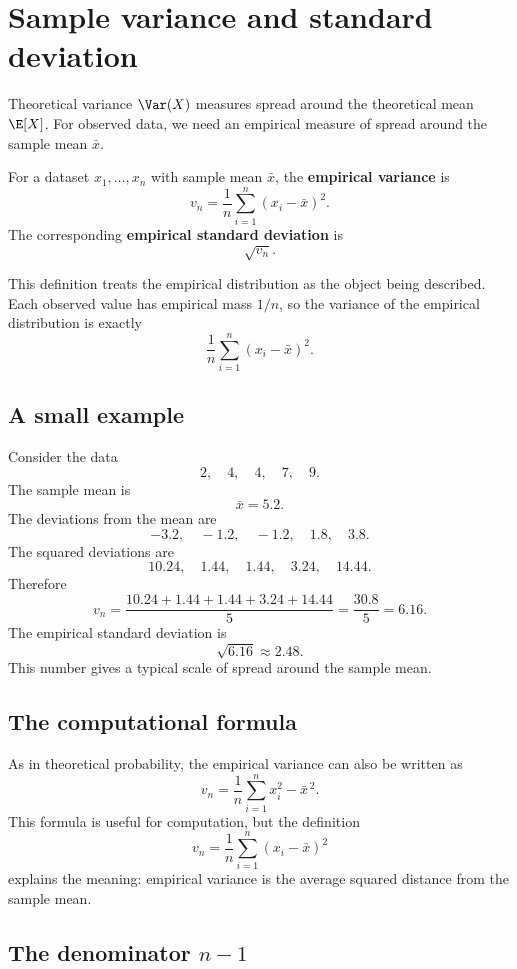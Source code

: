 \section{Sample variance and standard deviation}

Theoretical variance \(\Var(X)\) measures spread around the theoretical mean
\(\E[X]\). For observed data, we need an empirical measure of spread around the
sample mean \(\bar{x}\).

\begin{definitionbox}
For a dataset \(x_1,
\ldots,x_n\) with sample mean \(\bar{x}\), the
\textbf{empirical variance} is
\[
v_n=\frac1n\sum_{i=1}^n (x_i-\bar{x})^2.
\]
The corresponding \textbf{empirical standard deviation} is
\[
\sqrt{v_n}.
\]
\end{definitionbox}

This definition treats the empirical distribution as the object being described.
Each observed value has empirical mass \(1/n\), so the variance of the empirical
distribution is exactly
\[
\frac1n\sum_{i=1}^n (x_i-\bar{x})^2.
\]

\subsection*{A small example}

Consider the data
\[
2,\quad 4,\quad 4,\quad 7,\quad 9.
\]
The sample mean is
\[
\bar{x}=5.2.
\]
The deviations from the mean are
\[
-3.2,\quad -1.2,\quad -1.2,\quad 1.8,\quad 3.8.
\]
The squared deviations are
\[
10.24,\quad 1.44,\quad 1.44,\quad 3.24,\quad 14.44.
\]
Therefore
\[
v_n=\frac{10.24+1.44+1.44+3.24+14.44}{5}=\frac{30.8}{5}=6.16.
\]
The empirical standard deviation is
\[
\sqrt{6.16}\approx 2.48.
\]
This number gives a typical scale of spread around the sample mean.

\subsection*{The computational formula}

As in theoretical probability, the empirical variance can also be written as
\[
v_n=\frac1n\sum_{i=1}^n x_i^2-\bar{x}^{\,2}.
\]
This formula is useful for computation, but the definition
\[
v_n=\frac1n\sum_{i=1}^n (x_i-\bar{x})^2
\]
explains the meaning: empirical variance is the average squared distance from
the sample mean.

\subsection*{The denominator \(n-1\)}

